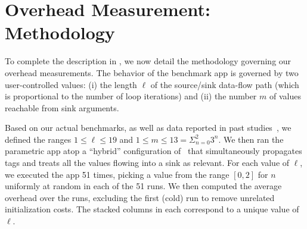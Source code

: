 \section{Overhead Measurement: Methodology}\label{Se:methodology}

To complete the description in , we now detail the methodology governing our overhead measurements. 
The behavior of the benchmark app is governed by two user-controlled values: (i) the length $\ell$ of the source/sink data-flow path (which is proportional to the number of loop iterations) and (ii) the number $m$ of values reachable from sink arguments.

Based on our actual benchmarks, as well as data reported in past studies~\cite{TPFSW:PLDI09}, we defined the ranges $1 \leq \ell \leq 19$ and $1 \leq m \leq 13 = \Sigma_{n=0}^{2} 3^n$. We then ran the parametric app atop a ``hybrid'' configuration of \Tool\ that simultaneously propagates tags and treats all the values flowing into a sink as relevant.
%
For each value of $\ell$, we executed the app 51 times, picking a value from the range $[0,2]$ for $n$ uniformly at random in each of the 51 runs. We then computed the average overhead over the runs, excluding the first (cold) run to remove unrelated initialization costs. The stacked columns in  each correspond to a unique value of $\ell$.
